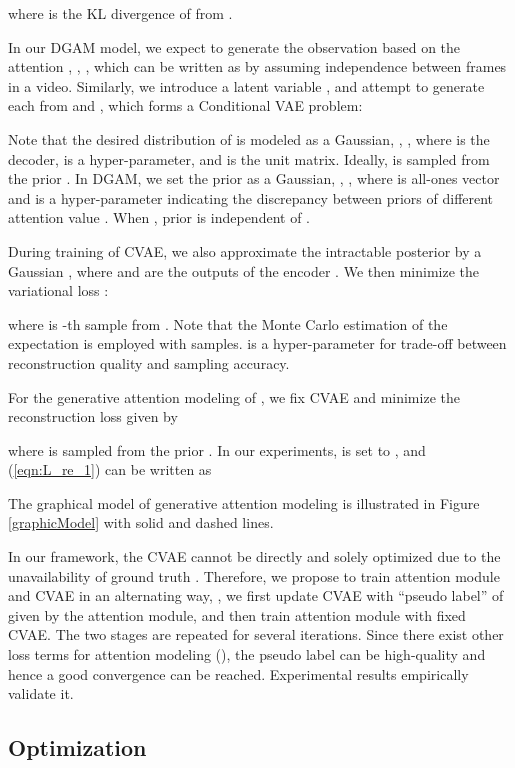 \documentclass[10pt,twocolumn,letterpaper]{article}
\begin{document}
where  is the KL divergence of  from .

In our DGAM model, we expect to generate the observation  based on the attention , \ie, , which can be written as  by assuming independence between frames in a video.
Similarly, we introduce a latent variable , and attempt to generate each  from  and , which forms a Conditional VAE problem:

Note that the desired distribution of  is modeled as a Gaussian, \ie, , where  is the decoder,  is a hyper-parameter, and  is the unit matrix.
Ideally,  is sampled from the prior .
In DGAM, we set the prior as a Gaussian, \ie, , where  is all-ones vector and  is a hyper-parameter indicating the discrepancy between priors of different attention value .
When , prior  is independent of .


During training of CVAE, we also approximate the intractable posterior  by a Gaussian , where  and  are the outputs of the encoder .
We then minimize the variational loss :

where  is -th sample from .
Note that the Monte Carlo estimation of the expectation  is employed
with  samples.
 is a hyper-parameter for trade-off between reconstruction quality and sampling accuracy.


For the generative attention modeling of , we fix CVAE and minimize the reconstruction loss  given by

where  is sampled from the prior .
In our experiments,  is set to , and (\ref{eqn:L_re_1}) can be written as

The graphical model of generative attention modeling is illustrated in Figure \ref{graphicModel} with solid and dashed lines.


In our framework, the CVAE cannot be directly and solely optimized due to the unavailability of ground truth .
Therefore, we propose to train attention module and CVAE in an alternating way, \ie, we first update CVAE with ``pseudo label'' of  given by the attention module, and then train attention module with fixed CVAE.
The two stages are repeated for several iterations.
Since there exist other loss terms for attention modeling (\eg ), the pseudo label can be high-quality and hence a good convergence can be reached.
Experimental results empirically validate it.


\subsection{Optimization}
\end{document}

